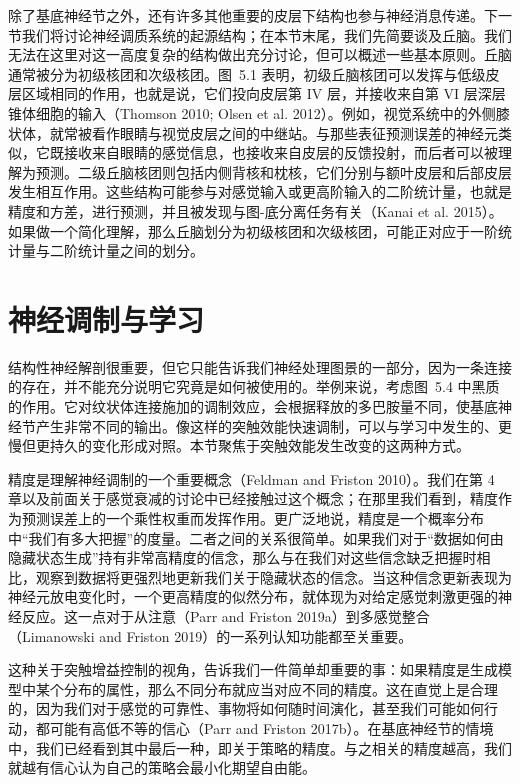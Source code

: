 除了基底神经节之外，还有许多其他重要的皮层下结构也参与神经消息传递。下一节我们将讨论神经调质系统的起源结构；在本节末尾，我们先简要谈及丘脑。我们无法在这里对这一高度复杂的结构做出充分讨论，但可以概述一些基本原则。丘脑通常被分为初级核团和次级核团。图~5.1 表明，初级丘脑核团可以发挥与低级皮层区域相同的作用，也就是说，它们投向皮层第 IV 层，并接收来自第 VI 层深层锥体细胞的输入（Thomson 2010; Olsen et al. 2012）。例如，视觉系统中的外侧膝状体，就常被看作眼睛与视觉皮层之间的中继站。与那些表征预测误差的神经元类似，它既接收来自眼睛的感觉信息，也接收来自皮层的反馈投射，而后者可以被理解为预测。二级丘脑核团则包括内侧背核和枕核，它们分别与额叶皮层和后部皮层发生相互作用。这些结构可能参与对感觉输入或更高阶输入的二阶统计量，也就是精度和方差，进行预测，并且被发现与图-底分离任务有关（Kanai et al. 2015）。如果做一个简化理解，那么丘脑划分为初级核团和次级核团，可能正对应于一阶统计量与二阶统计量之间的划分。

\section{神经调制与学习}

结构性神经解剖很重要，但它只能告诉我们神经处理图景的一部分，因为一条连接的存在，并不能充分说明它究竟是如何被使用的。举例来说，考虑图~5.4 中黑质的作用。它对纹状体连接施加的调制效应，会根据释放的多巴胺量不同，使基底神经节产生非常不同的输出。像这样的突触效能快速调制，可以与学习中发生的、更慢但更持久的变化形成对照。本节聚焦于突触效能发生改变的这两种方式。

精度是理解神经调制的一个重要概念（Feldman and Friston 2010）。我们在第 4 章以及前面关于感觉衰减的讨论中已经接触过这个概念；在那里我们看到，精度作为预测误差上的一个乘性权重而发挥作用。更广泛地说，精度是一个概率分布中“我们有多大把握”的度量。二者之间的关系很简单。如果我们对于“数据如何由隐藏状态生成”持有非常高精度的信念，那么与在我们对这些信念缺乏把握时相比，观察到数据将更强烈地更新我们关于隐藏状态的信念。当这种信念更新表现为神经元放电变化时，一个更高精度的似然分布，就体现为对给定感觉刺激更强的神经反应。这一点对于从注意（Parr and Friston 2019a）到多感觉整合（Limanowski and Friston 2019）的一系列认知功能都至关重要。

这种关于突触增益控制的视角，告诉我们一件简单却重要的事：如果精度是生成模型中某个分布的属性，那么不同分布就应当对应不同的精度。这在直觉上是合理的，因为我们对于感觉的可靠性、事物将如何随时间演化，甚至我们可能如何行动，都可能有高低不等的信心（Parr and Friston 2017b）。在基底神经节的情境中，我们已经看到其中最后一种，即关于策略的精度。与之相关的精度越高，我们就越有信心认为自己的策略会最小化期望自由能。

